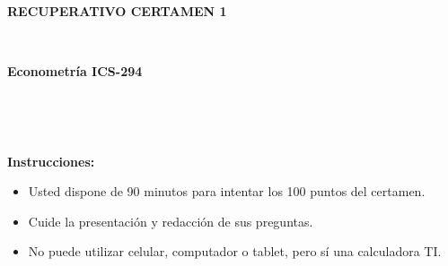 \documentclass[10pt,a4paper]{article}
\begin{document}
\vspace{5cm}



\begin{center}
\begin{large}
\textbf{\\RECUPERATIVO CERTAMEN 1}
\end{large}\\
\end{center}

\begin{center}
\begin{large}
\textbf{Econometría ICS-294}
\end{large}\\
\vspace{0.2cm}

\\
\end{center}

\textbf{Instrucciones:} 

\begin{itemize}

    \item Usted dispone de 90 minutos  para intentar los 100 puntos del certamen.
    \item Cuide la presentación y redacción de sus preguntas.
    \item No puede utilizar celular, computador o tablet, pero sí una calculadora TI.
     
\end{itemize}
\end{document}
